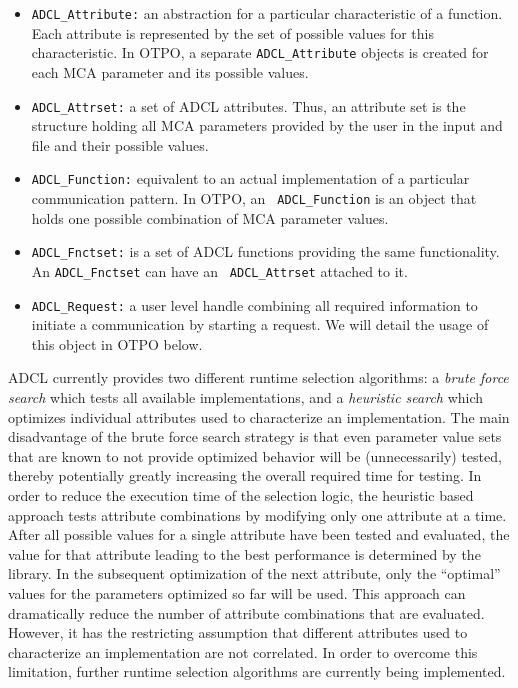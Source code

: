 \begin{itemize}
\item {\tt ADCL\_\-Attribute:} an abstraction for a particular
  characteristic of a function. Each attribute is represented by the
  set of possible values for this characteristic. In OTPO, a separate
  {\tt ADCL\_\-Attribute} objects is created for each MCA parameter
  and its possible values.
\item {\tt ADCL\_\-Attrset:} a set of ADCL attributes. Thus, an
  attribute set is the structure holding all MCA parameters provided
  by the user in the input and file and their possible values.
\item {\tt ADCL\_\-Function:} equivalent to an actual implementation
  of a particular communication pattern. In OTPO, an {\tt
    ADCL\_\-Function} is an object that holds one possible combination
  of MCA parameter values.
\item {\tt ADCL\_\-Fnctset:} is a set of ADCL functions providing the
  same functionality. An {\tt ADCL\_\-Fnctset} can have an {\tt
    ADCL\_\-Attrset} attached to it.
\item {\tt ADCL\_\-Request:} a user level handle combining all
  required information to initiate a communication by starting a
  request. We will detail the usage of this object in OTPO below.
\end{itemize}

ADCL currently provides two different runtime selection algorithms: a
{\it brute force search} which tests all available implementations,
and a {\it heuristic search} which optimizes individual attributes
used to characterize an implementation. The main disadvantage of the
brute force search strategy is that even parameter value sets that are
known to not provide optimized behavior will be (unnecessarily)
tested, thereby potentially greatly increasing the overall required
time for testing. In order to reduce the execution time of the selection
logic, the heuristic based approach tests attribute combinations by
modifying only one attribute at a time. After all possible values for
a single attribute have been tested and evaluated, the value for that
attribute leading to the best performance is determined by the
library. In the subsequent optimization of the next attribute, only
the ``optimal'' values for the parameters optimized so far will be
used. This approach can dramatically reduce the number of attribute
combinations that are evaluated. However, it has the restricting
assumption that different attributes used to characterize an
implementation are not correlated. In order to overcome this
limitation, further runtime selection algorithms are currently being
implemented.